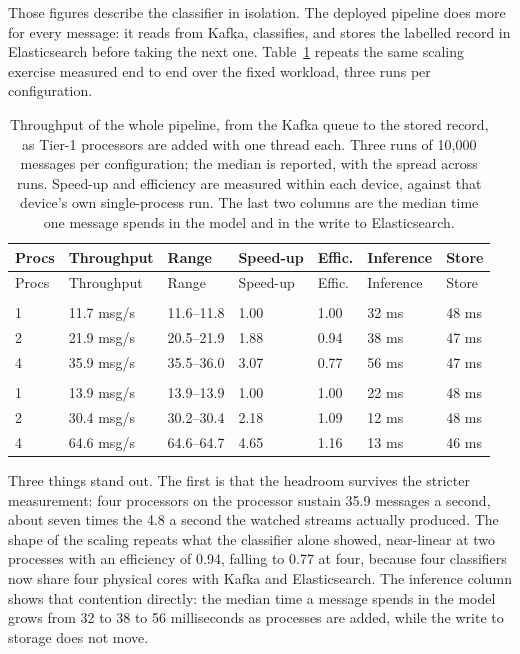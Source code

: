 Those figures describe the classifier in isolation. The deployed pipeline does more for every message: it reads from Kafka, classifies, and stores the labelled record in Elasticsearch before taking the next one. Table~\ref{tab:pipeline-scaling} repeats the same scaling exercise measured end to end over the fixed workload, three runs per configuration.

{\small\setlength{\tabcolsep}{3.5pt}
\begin{longtable}{@{}lllllll@{}}
\caption{Throughput of the whole pipeline, from the Kafka queue to the stored record, as Tier-1 processors are added with one thread each. Three runs of 10,000 messages per configuration; the median is reported, with the spread across runs. Speed-up and efficiency are measured within each device, against that device's own single-process run. The last two columns are the median time one message spends in the model and in the write to Elasticsearch.}\label{tab:pipeline-scaling}\tabularnewline
\toprule
Procs & Throughput & Range & Speed-up & Effic. & Inference & Store \\
\midrule
\endfirsthead
\toprule
Procs & Throughput & Range & Speed-up & Effic. & Inference & Store \\
\midrule
\endhead
\bottomrule
\endlastfoot
\multicolumn{7}{@{}l}{\emph{on the processor, the deployed default}} \\
1 & 11.7 msg/s & 11.6--11.8 & 1.00 & 1.00 & 32 ms & 48 ms \\
2 & 21.9 msg/s & 20.5--21.9 & 1.88 & 0.94 & 38 ms & 47 ms \\
4 & 35.9 msg/s & 35.5--36.0 & 3.07 & 0.77 & 56 ms & 47 ms \\
\addlinespace[0.5em]
\multicolumn{7}{@{}l}{\emph{on the GPU, selected by one configuration value}} \\
1 & 13.9 msg/s & 13.9--13.9 & 1.00 & 1.00 & 22 ms & 48 ms \\
2 & 30.4 msg/s & 30.2--30.4 & 2.18 & 1.09 & 12 ms & 48 ms \\
4 & 64.6 msg/s & 64.6--64.7 & 4.65 & 1.16 & 13 ms & 46 ms \\
\end{longtable}
}

Three things stand out. The first is that the headroom survives the stricter measurement: four processors on the processor sustain 35.9 messages a second, about seven times the 4.8 a second the watched streams actually produced. The shape of the scaling repeats what the classifier alone showed, near-linear at two processes with an efficiency of 0.94, falling to 0.77 at four, because four classifiers now share four physical cores with Kafka and Elasticsearch. The inference column shows that contention directly: the median time a message spends in the model grows from 32 to 38 to 56 milliseconds as processes are added, while the write to storage does not move.

